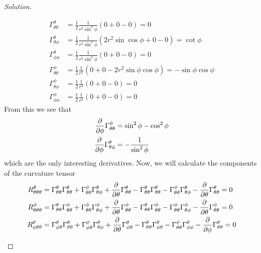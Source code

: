 \documentclass[a4paper]{article}
\begin{document}
\begin{proof}[Solution]
\begin{enumerate}
  \[
    \begin{aligned}
      \Gamma_{\theta \theta}^\theta &= \frac{1}{2}\frac{1}{r^2 \sin^2 \phi} \left(0 +  0 - 0\right) = 0 \\
      \Gamma_{\theta \phi}^\theta &=  \frac{1}{2} \frac{1}{r^2 \sin^2 \phi} \left(2r^2 \sin \cos\phi + 0 - 0  \right) = \cot\phi \\
      \Gamma_{\phi \phi}^\theta &= \frac{1}{2} \frac{1}{r^2 \sin^2 \phi} \left(0 + 0 - 0  \right) = 0 \\
      \Gamma_{\theta \theta}^\phi &= \frac{1}{2} \frac{1}{r^2} \left(0 + 0 - 2r^2 \sin \phi \cos \phi \right) = -\sin \phi \cos \phi \\
      \Gamma_{\theta \phi}^\phi &= \frac{1}{2} \frac{1}{r^2} \left(0 + 0 - 0\right) = 0 \\
      \Gamma_{\phi \phi}^\phi &= \frac{1}{2} \frac{1}{r^2} \left( 0 + 0 - 0 \right) = 0
    \end{aligned}
  \]
  From this we see that
  \[
    \begin{aligned}
      \pdv{\phi} \Gamma_{\theta \theta}^\phi &= \sin^2 \phi - \cos^2 \phi \\
      \pdv{\phi} \Gamma_{\theta \phi}^\theta &= - \frac{1}{\sin^2 \phi} 
    \end{aligned}
  \]
  which are the only interesting derivatives. Now, we will calculate the components of the curvature tensor
  \[
    \begin{aligned}
      R_{\theta \theta \theta}^\theta &= \Gamma_{\theta \theta}^\theta \Gamma_{\theta \theta}^\theta + \Gamma_{\theta \theta}^\phi \Gamma_{\theta \phi}^{\theta} + \pdv{\theta} \Gamma_{\theta \theta}^\theta - \Gamma_{\theta \theta}^\theta \Gamma_{\theta \theta}^\theta - \Gamma_{\theta \theta}^\phi \Gamma_{\theta \phi}^\theta - \pdv{\theta} \Gamma_{\theta \theta}^\theta = 0\\
      R_{\theta \theta \theta}^\phi &= \Gamma_{\theta \theta}^\theta \Gamma_{\theta \theta}^\phi + \Gamma_{\theta \theta}^\phi \Gamma_{\theta \phi}^\phi + \pdv{\theta} \Gamma_{\theta \theta}^\phi - \Gamma_{\theta \theta}^\theta \Gamma_{\theta \theta}^\phi  - \Gamma_{\theta \theta}^\phi \Gamma_{\theta \phi}^\phi - \pdv{\theta} \Gamma_{\theta \theta}^\phi = 0 \\
      R_{\phi \theta \theta}^\theta &= \Gamma_{\phi \theta}^\theta \Gamma_{\theta \theta}^\theta + \Gamma_{\phi \theta}^\phi \Gamma_{\theta \phi}^\theta + \pdv{\theta} \Gamma_{\phi \theta}^\theta - \Gamma_{\theta \theta}^\theta \Gamma_{\phi \theta}^\theta  - \Gamma_{\theta \theta}^\phi \Gamma_{\phi \phi}^\theta - \pdv{\phi} \Gamma_{\theta \theta}^\theta = 0 \\

\end{aligned}\]
\end{enumerate}
\end{proof}
\end{document}
